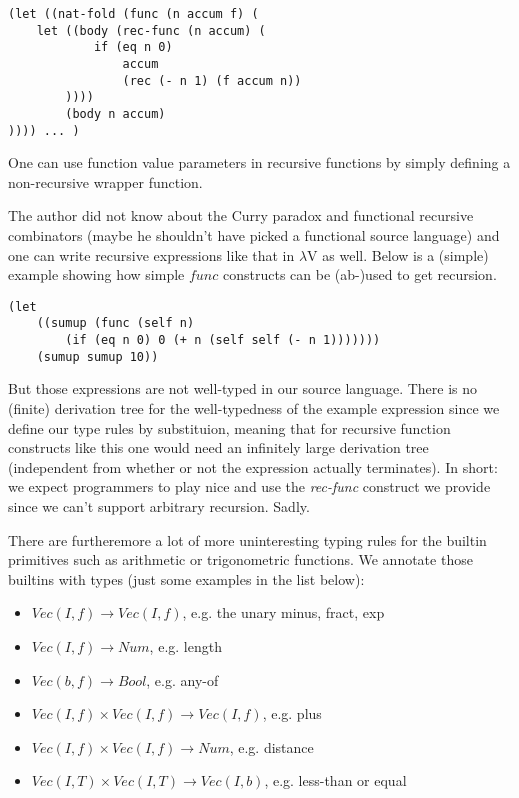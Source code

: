 \documentclass[letterpaper,12pt]{article}
\begin{document}
\begin{lstlisting}
(let ((nat-fold (func (n accum f) (
	let ((body (rec-func (n accum) (
			if (eq n 0)
				accum
				(rec (- n 1) (f accum n))
		))))
		(body n accum)
)))) ... )
\end{lstlisting}

One can use function value parameters in recursive functions
by simply defining a non-recursive wrapper function.

The author did not know about the Curry paradox and functional
recursive combinators (maybe he shouldn't have picked a functional source language)
and one can write recursive expressions like that in $\lambda$V as well.
Below is a (simple) example showing how simple $func$ constructs can
be (ab-)used to get recursion.

\begin{lstlisting}
(let 
	((sumup (func (self n) 
		(if (eq n 0) 0 (+ n (self self (- n 1)))))))
	(sumup sumup 10))
\end{lstlisting}

But those expressions are not well-typed in our source language.
There is no (finite) derivation tree
for the well-typedness of the example expression since we define our
type rules by substituion, meaning that for recursive function constructs
like this one would need an infinitely large derivation tree (independent
from whether or not the expression actually terminates).
In short: we expect programmers to play nice and use the \textit{rec-func}
construct we provide since we can't support arbitrary recursion. Sadly.

There are furtheremore a lot of more uninteresting typing rules for
the builtin primitives such as arithmetic or trigonometric functions.
We annotate those builtins with types (just some examples in the list below):

\begin{itemize}
	\item $Vec(I,f) \rightarrow Vec(I,f)$, e.g. the unary minus, fract, exp
	\item $Vec(I,f) \rightarrow Num$, e.g. length
	\item $Vec(b,f) \rightarrow Bool$, e.g. any-of
	\item $Vec(I,f) \times Vec(I,f) \rightarrow Vec(I,f)$, e.g. plus
	\item $Vec(I,f) \times Vec(I,f) \rightarrow Num$, e.g. distance
	\item $Vec(I,T) \times Vec(I,T) \rightarrow Vec(I,b)$, e.g. less-than or equal
\end{itemize}
\end{document}
